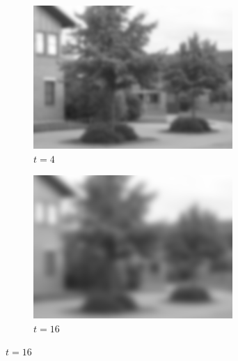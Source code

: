 \documentclass[a4paper,12pt]{article}
\begin{document}
\begin{figure}[h]
    \begin{subfigure}[b]{0.4\linewidth}
    \includegraphics[width=\linewidth]{Scalespace2.png}
    \caption{$t=4$}
    \end{subfigure}
    \begin{subfigure}[b]{0.4\linewidth}
    \includegraphics[width=\linewidth]{Scalespace3.png}
    \caption{$t=16$}
    \end{subfigure}


\end{figure}
\end{document}
